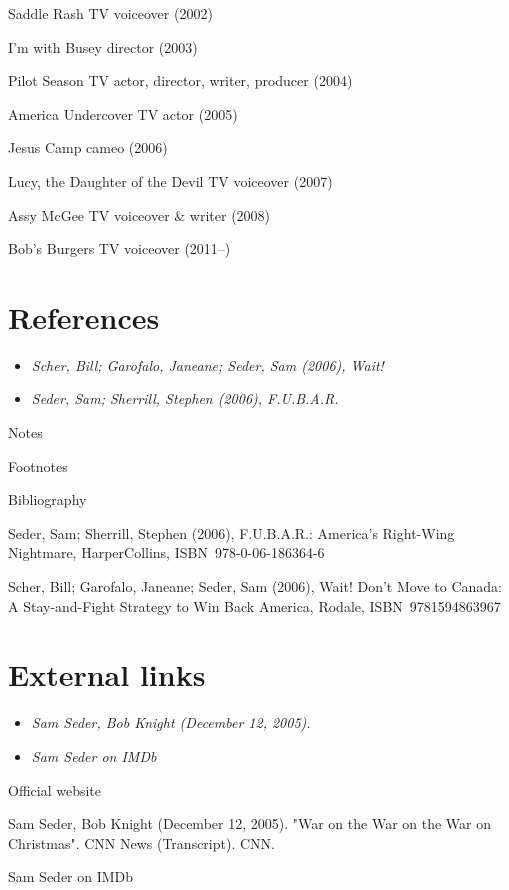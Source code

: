 Saddle Rash TV voiceover (2002)

I'm with Busey director (2003)

Pilot Season TV actor, director, writer, producer (2004)

America Undercover TV actor (2005)

Jesus Camp cameo (2006)

Lucy, the Daughter of the Devil TV voiceover (2007)

Assy McGee TV voiceover \& writer (2008)

Bob's Burgers TV voiceover (2011--)

\section{References}\label{references}

\begin{itemize}
\item
  \emph{Scher, Bill; Garofalo, Janeane; Seder, Sam (2006), Wait!}
\item
  \emph{Seder, Sam; Sherrill, Stephen (2006), F.U.B.A.R.}
\end{itemize}

Notes

Footnotes

Bibliography

Seder, Sam; Sherrill, Stephen (2006), F.U.B.A.R.: America's Right-Wing
Nightmare, HarperCollins, ISBN~978-0-06-186364-6

Scher, Bill; Garofalo, Janeane; Seder, Sam (2006), Wait! Don't Move to
Canada: A Stay-and-Fight Strategy to Win Back America, Rodale,
ISBN~9781594863967

\section{External links}\label{external-links}

\begin{itemize}
\item
  \emph{Sam Seder, Bob Knight (December 12, 2005).}
\item
  \emph{Sam Seder on IMDb}
\end{itemize}

Official website

Sam Seder, Bob Knight (December 12, 2005). "War on the War on the War on
Christmas". CNN News (Transcript). CNN.

Sam Seder on IMDb
